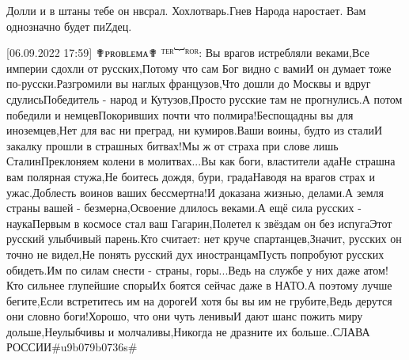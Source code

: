 Долли и в штаны тебе он нвсрал. Хохлотварь.Гнев Народа наростает. Вам
однозначно будет пиZдец.

[06.09.2022 17:59] ✟ᴘʀᴏʙʟᴇᴍᴀ✟ ᵀᴱᴿ︸ᴿᴼᴿ: Вы врагов истребляли веками,Все империи сдохли от русских,Потому что сам Бог видно с вамиИ он думает тоже по-русски.Разгромили вы наглых французов,Что дошли до Москвы и вдруг сдулисьПобедитель - народ и Кутузов,Просто русские там не прогнулись.А потом победили и немцевПокоривших почти что полмира!Беспощадны вы для иноземцев,Нет для вас ни преград, ни кумиров.Ваши воины, будто из сталиИ закалку прошли в страшных битвах!Мы ж от страха при слове лишь СталинПреклоняем колени в молитвах...Вы как боги, властители адаНе страшна вам полярная стужа,Не боитесь дождя, бури, градаНаводя на врагов страх и ужас.Доблесть воинов ваших бессмертна!И доказана жизнью, делами.А земля страны вашей - безмерна,Освоение длилось веками.А ещё сила русских - наукаПервым в космосе стал ваш Гагарин,Полетел к звёздам он без испугаЭтот русский улыбчивый парень.Кто считает: нет круче спартанцев,Значит, русских он точно не видел,Не понять русский дух иностранцамПусть попробуют русских обидеть.Им по силам снести - страны, горы...Ведь на службе у них даже атом!Кто сильнее глупейшие спорыИх боятся сейчас даже в НАТО.А поэтому лучше бегите,Если встретитесь им на дорогеИ хотя бы вы им не грубите,Ведь дерутся они словно боги!Хорошо, что они чуть ленивыИ дают шанс пожить миру дольше,Неулыбчивы и молчаливы,Никогда не дразните их больше..СЛАВА РОССИИ#u9b079b0736s#

